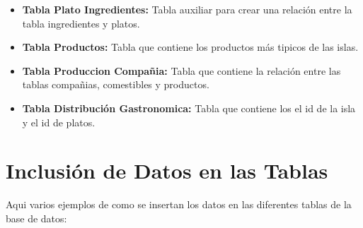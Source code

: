 \documentclass[11pt]{report}
\begin{document}
\begin{itemize}
      \item \textbf{Tabla Plato Ingredientes:} Tabla auxiliar para crear una relación entre la tabla ingredientes y platos.
            \lstset{style=mystyle}
            

      \item \textbf{Tabla Productos:} Tabla que contiene los productos más tipicos de las islas.
            \lstset{style=mystyle}
            

      \item \textbf{Tabla Produccion Compañia:} Tabla que contiene la relación entre las tablas compañias, comestibles y productos.
            \lstset{style=mystyle}
            

      \item \textbf{Tabla Distribución Gastronomica:} Tabla que contiene los el id de la isla y el id de platos.
            \lstset{style=mystyle}
            
\end{itemize}

\section{Inclusión de Datos en las Tablas}
Aqui varios ejemplos de como se insertan los datos en las diferentes tablas de la base de datos:
\lstset{style=mystyle}


\newpage
\end{document}
